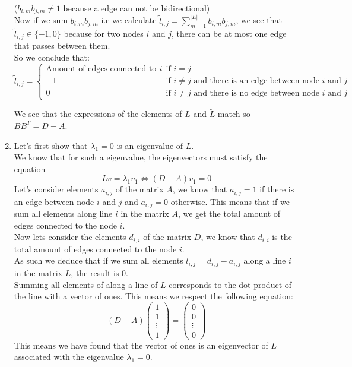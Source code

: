 \documentclass[11pt, legalpaper]{article}
\begin{document}
\begin{enumerate}
\begin{itemize}
    \end{itemize} 
    ($b_{i,m}b_{j,m} \ne 1$ because a edge can not be bidirectional) \\
    Now if we sum $b_{i,m}b_{j,m}$ i.e we calculate $\tilde{l}_{i,j}=\sum_{m=1}^{|E|}b_{i,m}b_{j,m}$, we see that $\tilde{l}_{i,j} \in \{-1, 0\}$ because for two nodes $i$ and $j$, there can be at most one edge that passes between them. \\
    So we conclude that:
    $$\tilde{l}_{i,j}=\begin{cases}
        \text{Amount of edges connected to node $i$} & \text{if } i=j\\
        -1 & \text{if } i \ne j \text{ and there is an edge between node $i$ and $j$}\\
        0 & \text{if } i \ne j \text{ and there is no edge between node $i$ and $j$}
    \end{cases}$$

    We see that the expressions of the elements of $L$ and $\tilde{L}$ match so $BB^T=D-A$.
    \item Let's first show that $\lambda_1=0$ is an eigenvalue of $L$. \\
            We know that for such a eigenvalue, the eigenvectors must satisfy the equation
            $$Lv=\lambda_1 v_1 \Longleftrightarrow (D-A)v_1=0$$ 
            Let's consider elements $a_{i,j}$ of the matrix $A$, we know that $a_{i,j}=1$ if there is an edge between node $i$ and $j$ and $a_{i,j}=0$ otherwise. 
            This means that if we sum all elements along line $i$ in the matrix $A$, we get the total amount of edges connected to the node $i$. \\
            Now lets consider the elements $d_{i,i}$ of the matrix $D$, we know that $d_{i,i}$ is the total amount of edges connected to the node $i$. \\
            As such we deduce that if we sum all elements $l_{i,j}=d_{i,j}-a_{i,j}$ along a line $i$ in the matrix $L$, the result is 0. \\
            Summing all elements of along a line of $L$ corresponds to the dot product of the line with a vector of ones. This means we respect the following equation:
            $$(D-A)\begin{pmatrix} 1 \\ 1 \\ \vdots \\ 1 \end{pmatrix}=\begin{pmatrix} 0 \\ 0 \\ \vdots \\ 0 \end{pmatrix}$$
            This means we have found that the vector of ones is an eigenvector of $L$ associated with the eigenvalue $\lambda_1=0$.\\


\end{enumerate}
\end{document}
